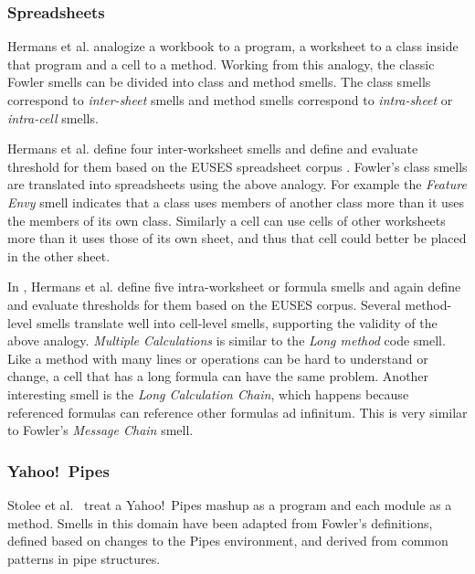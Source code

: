 \documentclass[10pt,conference,compsocconf]{IEEEtran}
\begin{document}
 \subsubsection{Spreadsheets}
Hermans et al. \cite{Hermans2012inter} \cite{Hermans2012intra} analogize a workbook to a program, a worksheet to a class inside that program and a cell to a method.
Working from this analogy, the classic Fowler smells can be divided into class and method smells.
The class smells correspond to \textit{inter-sheet} smells and method smells correspond to \textit{intra-sheet} or \textit{intra-cell} smells.

Hermans et al. \cite{Hermans2012inter} define four inter-worksheet smells and define and evaluate threshold for them based on the EUSES spreadsheet corpus \cite{fisher2005euses}.
Fowler's class smells are translated into spreadsheets using the above analogy. 
For example the \textit{Feature Envy} smell indicates that a class uses members of another class more than it uses the members of its own class.
Similarly a cell can use cells of other worksheets more than it uses those of its own sheet, and thus that cell could better be placed in the other sheet.

In \cite{Hermans2012intra}, Hermans et al. define five intra-worksheet or formula smells and again define and evaluate thresholds for them based on the EUSES corpus.
Several method-level smells translate well into cell-level smells, supporting the validity of the above analogy.
\textit{Multiple Calculations} is similar to the \textit{Long method} code smell.
Like a method with many lines or operations can be hard to understand or change, a cell that has a long formula can have the same problem.
Another interesting smell is the \textit{Long Calculation Chain}, which happens because referenced formulas can reference other formulas ad infinitum.
This is very similar to Fowler's \textit{Message Chain} smell.

%




\subsubsection{Yahoo!\ Pipes}
Stolee et al.~\cite{Stolee2011, StoleeTSE2013} treat a Yahoo!\ Pipes mashup as a program and each module as a method. Smells in this domain have been adapted from Fowler's definitions, defined based on changes to the Pipes environment, and derived from common patterns in pipe structures. 
\end{document}
